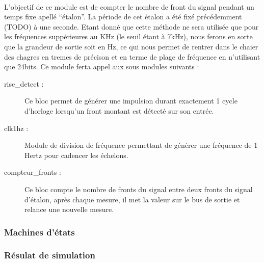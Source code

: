 \documentclass[a4paper,11pt]{article}
\begin{document}
\paragraph{} L'objectif de ce module est de compter le nombre de front du signal pendant un temps fixe apellé ``étalon''.
La période de cet étalon a été fixé précédemment (TODO) à une seconde. Etant donné que cette méthode ne sera utilisée que pour les 
fréquences suppérieures au KHz (le seuil étant à 7kHz), nous ferons en sorte que la grandeur de sortie soit en Hz, ce qui nous permet 
de rentrer dans le chaier des chagres en tremes de précison et en terme de plage de fréquence en n'utilisant que 24bits. Ce module 
ferta appel aux sous modules suivants :

\begin{description}
  \item[rise\_detect : ] Ce bloc permet de générer une impulsion durant exactement 1 cycle d'horloge lorsqu'un front montant est détecté
  sur son entrée.
  \item[clk1hz : ] Module de division de fréquence permettant de générer une fréquence de 1 Hertz pour cadencer les échelons.
  \item[compteur\_fronts : ] Ce bloc compte le nombre de fronts du signal entre deux fronts du signal d'étalon, après chaque mesure,
  il met la valeur sur le bus de sortie et relance une nouvelle mesure.
\end{description}


  \subsubsection{Machines d'états}
  \subsubsection{Résulat de simulation}
\end{document}
